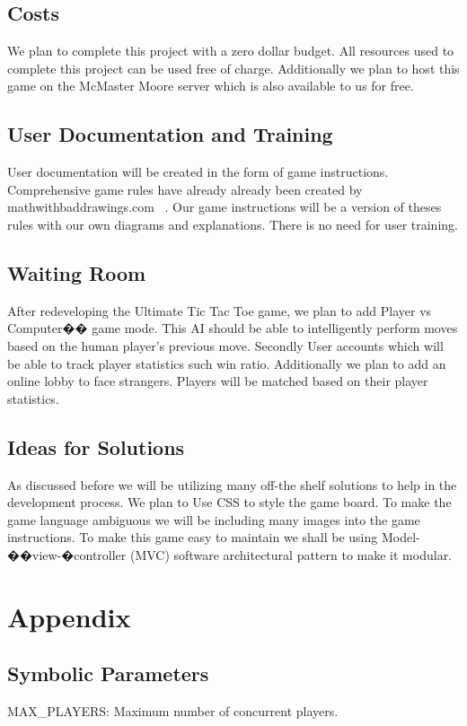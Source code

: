 \documentclass[12pt, titlepage]{article}
\begin{document}
\subsection{Costs}
We plan to complete this project with a zero dollar budget. All resources used
to complete this project can be used free of charge. Additionally we plan to
host this game on the McMaster Moore server which is also available to us for
free.

\subsection{User Documentation and Training}
User documentation will be created in the form of game instructions.
Comprehensive game rules have already already been created by
mathwithbaddrawings.com~\citep{Rules} . Our game instructions will be a version
of theses rules with our own diagrams and explanations. There is no need for
user training.


\subsection{Waiting Room}
After redeveloping the Ultimate Tic Tac Toe game, we plan to add Player vs
Computer�� game mode. This AI should be able to intelligently perform moves based
on the human player's previous move. Secondly User accounts which will be able
to track player statistics such win ratio. Additionally we plan to add an online
lobby to face strangers. Players will be matched based on their player
statistics.

\subsection{Ideas for Solutions}
As discussed before we will be utilizing many off-the shelf solutions to help in
the development process. We plan to Use CSS to style the game board. To make the
game language ambiguous we will be including many images into the game
instructions. To make this game easy to maintain we shall be using
Model-��view-�controller (MVC) software architectural pattern to make it
modular.





\newpage

\section{Appendix}

\subsection{Symbolic Parameters}
MAX\_PLAYERS: Maximum number of concurrent players.
\end{document}
